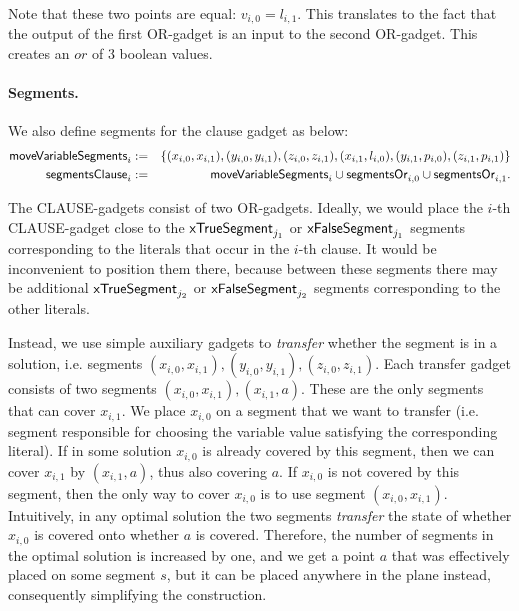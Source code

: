 Note that these two points are equal: $v_{i,0} = l_{i,1}$.
This translates to the fact that the output of the first OR-gadget
is an input to the second OR-gadget.
This creates an $or$ of 3 boolean values.

\paragraph{Segments.}
We also define segments for the clause gadget as below:
\begin{eqnarray*}
\mathsf{moveVariableSegments}_{i} & := & \{
(x_{i, 0}, x_{i, 1}),
(y_{i, 0}, y_{i, 1}),
(z_{i, 0}, z_{i, 1}),
(x_{i, 1}, l_{i, 0}),
(y_{i, 1}, p_{i, 0}),
(z_{i, 1}, p_{i, 1})
\} \\
\mathsf{segmentsClause}_i & := & \mathsf{moveVariableSegments}_{i} \cup \mathsf{segmentsOr}_{i,0} \cup \mathsf{segmentsOr}_{i,1}.
\end{eqnarray*}

\newcommand{\segmentsClauseSolTrue}[1]{\mathsf{solClause}^{\true,#1}}
\newcommand{\segmentsClauseSolFalse}{\mathsf{solClause}^{\false}}

The CLAUSE-gadgets consist of two OR-gadgets.
Ideally, we would place the $i$-th CLAUSE-gadget close to the
$\mathsf{xTrueSegment}_{j_1}$ or $\mathsf{xFalseSegment}_{j_1}$ segments
corresponding to the literals that occur in the $i$-th clause.
It would be inconvenient to position them there,
because between these segments there may be additional
$\mathsf{xTrueSegment}_{j_2}$ or $\mathsf{xFalseSegment}_{j_2}$
segments corresponding to the other literals.

Instead, we use simple auxiliary gadgets to
\textit{transfer} whether the segment
is in a solution, i.e. segments
$(x_{i, 0}, x_{i, 1}), (y_{i, 0}, y_{i, 1}), (z_{i, 0}, z_{i, 1})$.
Each transfer gadget consists of two segments $(x_{i, 0}, x_{i, 1}), (x_{i, 1}, a)$.
These are the only segments that can cover $x_{i,1}$.
We place $x_{i,0}$ on a segment that we want to transfer (i.e.
segment responsible for choosing the variable value satisfying the
corresponding literal).
If in some solution $x_{i,0}$ is already covered by this segment, then
we can cover $x_{i,1}$ by $(x_{i,1}, a)$, thus also covering $a$.
If $x_{i,0}$ is not covered by this segment,
then the only way to cover $x_{i,0}$ is to use segment $(x_{i, 0}, x_{i, 1})$.
Intuitively,
in any optimal solution the two segments \textit{transfer} the state of whether $x_{i,0}$
is covered onto whether $a$ is covered.
Therefore, the number of segments in the optimal solution is increased by one,
and we get a point $a$ that was effectively placed
on some segment $s$, but it can be placed anywhere in the plane instead,
consequently simplifying the construction.

